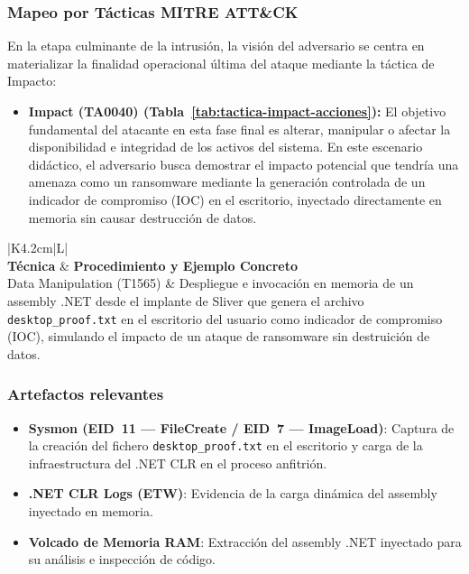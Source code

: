 \subsubsection{Mapeo por Tácticas MITRE ATT\&CK}

En la etapa culminante de la intrusión, la visión del adversario se centra en materializar la finalidad operacional última del ataque mediante la táctica de Impacto:

\begin{itemize}
    \item \textbf{Impact (TA0040) (Tabla~\ref{tab:tactica-impact-acciones}):} El objetivo fundamental del atacante en esta fase final es alterar, manipular o afectar la disponibilidad e integridad de los activos del sistema. En este escenario didáctico, el adversario busca demostrar el impacto potencial que tendría una amenaza como un ransomware mediante la generación controlada de un indicador de compromiso (IOC) en el escritorio, inyectado directamente en memoria sin causar destrucción de datos.
\end{itemize}

\begin{table}[htbp]
    \centering
    \caption{Táctica: Impact (TA0040) — Fase de Acciones sobre el Objetivo}
    \label{tab:tactica-impact-acciones}
    \renewcommand{\arraystretch}{1.3}
    \small
    \begin{tabularx}{\textwidth}{|K{4.2cm}|L|}
        \hline
         \\ \hline
        \textbf{Técnica} & \textbf{Procedimiento y Ejemplo Concreto} \\ \hline
        Data Manipulation (T1565) & Despliegue e invocación en memoria de un assembly .NET desde el implante de Sliver que genera el archivo \texttt{desktop\_proof.txt} en el escritorio del usuario como indicador de compromiso (IOC), simulando el impacto de un ataque de ransomware sin destruición de datos. \\ \hline
    \end{tabularx}
\end{table}

\subsubsection{Artefactos relevantes}

\begin{itemize}
    \item \textbf{Sysmon (EID~11 — FileCreate / EID~7 — ImageLoad)}: Captura de la creación del fichero \texttt{desktop\_proof.txt} en el escritorio y carga de la infraestructura del .NET CLR en el proceso anfitrión.
    \item \textbf{.NET CLR Logs (ETW)}: Evidencia de la carga dinámica del assembly inyectado en memoria.
    \item \textbf{Volcado de Memoria RAM}: Extracción del assembly .NET inyectado para su análisis e inspección de código.
\end{itemize}

